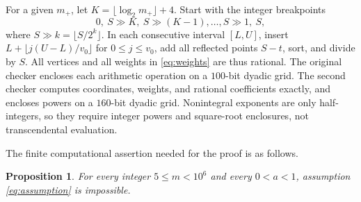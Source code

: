 \documentclass[11pt,letterpaper,reqno]{amsart}
\newtheorem{prop}[thm]{Proposition}
\theoremstyle{definition}
\numberwithin{equation}{section}
\begin{document}
For a given $m_+$, let $K=\lfloor\log_2m_+\rfloor+4$. Start with the integer breakpoints
\[
 0,\ S\mathbin{\gg}K,\ S\mathbin{\gg}(K-1),\ldots,
 S\mathbin{\gg}1,\ S,
\]
where $S\mathbin{\gg}k=\lfloor S/2^k\rfloor$. In each consecutive interval $[L,U]$, insert $L+\lfloor j(U-L)/v_0\rfloor$ for $0\le j\le v_0$, add all reflected points $S-t$, sort, and divide by $S$. All vertices and all weights in \eqref{eq:weights} are thus rational. The original checker encloses each arithmetic operation on a $100$-bit dyadic grid. The second checker computes coordinates, weights, and rational coefficients exactly, and encloses powers on a $160$-bit dyadic grid. Nonintegral exponents are only half-integers, so they require integer powers and square-root enclosures, not transcendental evaluation.

The finite computational assertion needed for the proof is as follows.

\begin{prop}\label{prop:finite}
For every integer $5\le m<10^6$ and every $0<a<1$, assumption \eqref{eq:assumption} is impossible.
\end{prop}
\end{document}
